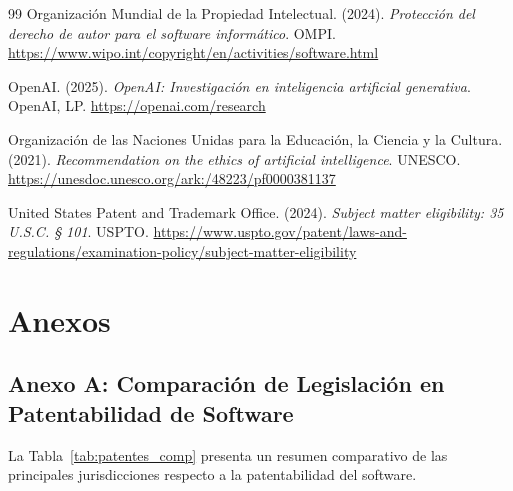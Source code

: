 \documentclass[11pt,a4paper]{report}
\begin{document}
\begin{thebibliography}{99}
Organización Mundial de la Propiedad Intelectual. (2024). \textit{Protección del derecho de autor para el software informático}. OMPI. \url{https://www.wipo.int/copyright/en/activities/software.html}

OpenAI. (2025). \textit{OpenAI: Investigación en inteligencia artificial generativa}. OpenAI, LP. \url{https://openai.com/research}

Organización de las Naciones Unidas para la Educación, la Ciencia y la Cultura. (2021). \textit{Recommendation on the ethics of artificial intelligence}. UNESCO. \url{https://unesdoc.unesco.org/ark:/48223/pf0000381137}

United States Patent and Trademark Office. (2024). \textit{Subject matter eligibility: 35 U.S.C. § 101}. USPTO. \url{https://www.uspto.gov/patent/laws-and-regulations/examination-policy/subject-matter-eligibility}

\end{thebibliography}

\newpage

\chapter*{Anexos}

\section*{Anexo A: Comparación de Legislación en Patentabilidad de Software}

La Tabla~\ref{tab:patentes_comp} presenta un resumen comparativo de las principales jurisdicciones respecto a la patentabilidad del software.
\end{document}
